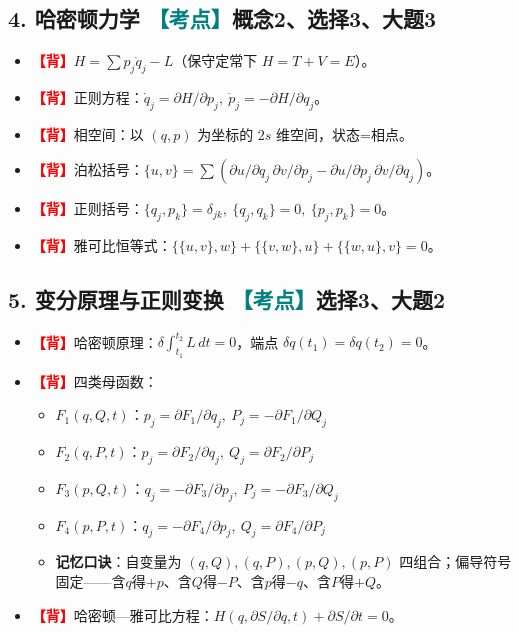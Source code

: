 \documentclass[UTF8,a4paper,11pt]{ctexart}
\newcommand{\bp}{\textcolor{red}{\textbf{【背】}}}
\newcommand{\km}{\textcolor{teal}{\textbf{【考点】}}}
\begin{document}
\subsection*{4. 哈密顿力学 \km 概念2、选择3、大题3}
\begin{itemize}[label=$\square$]
  \item \bp $H=\sum p_j\dot q_j-L$（保守定常下 $H=T+V=E$）。
  \item \bp 正则方程：$\dot q_j=\partial H/\partial p_j,\ \dot p_j=-\partial H/\partial q_j$。
  \item \bp 相空间：以 $(q,p)$ 为坐标的 $2s$ 维空间，状态=相点。
  \item \bp 泊松括号：$\{u,v\}=\sum(\partial u/\partial q_j\,\partial v/\partial p_j-\partial u/\partial p_j\,\partial v/\partial q_j)$。
  \item \bp 正则括号：$\{q_j,p_k\}=\delta_{jk},\ \{q_j,q_k\}=0,\ \{p_j,p_k\}=0$。
  \item \bp 雅可比恒等式：$\{\{u,v\},w\}+\{\{v,w\},u\}+\{\{w,u\},v\}=0$。
\end{itemize}

\subsection*{5. 变分原理与正则变换 \km 选择3、大题2}
\begin{itemize}[label=$\square$]
  \item \bp 哈密顿原理：$\delta\!\int_{t_1}^{t_2}L\,dt=0$，端点 $\delta q(t_1)=\delta q(t_2)=0$。
  \item \bp 四类母函数：
    \begin{itemize}[label=$\square$]
      \item $F_1(q,Q,t)$：$p_j=\partial F_1/\partial q_j,\ P_j=-\partial F_1/\partial Q_j$
      \item $F_2(q,P,t)$：$p_j=\partial F_2/\partial q_j,\ Q_j=\partial F_2/\partial P_j$
      \item $F_3(p,Q,t)$：$q_j=-\partial F_3/\partial p_j,\ P_j=-\partial F_3/\partial Q_j$
      \item $F_4(p,P,t)$：$q_j=-\partial F_4/\partial p_j,\ Q_j=\partial F_4/\partial P_j$
    \item \textbf{记忆口诀}：自变量为 $(q,Q),(q,P),(p,Q),(p,P)$ 四组合；偏导符号固定——含$q$得$+p$、含$Q$得$-P$、含$p$得$-q$、含$P$得$+Q$。
    \end{itemize}
  \item \bp 哈密顿—雅可比方程：$H(q,\partial S/\partial q,t)+\partial S/\partial t=0$。
\end{itemize}
\end{document}
